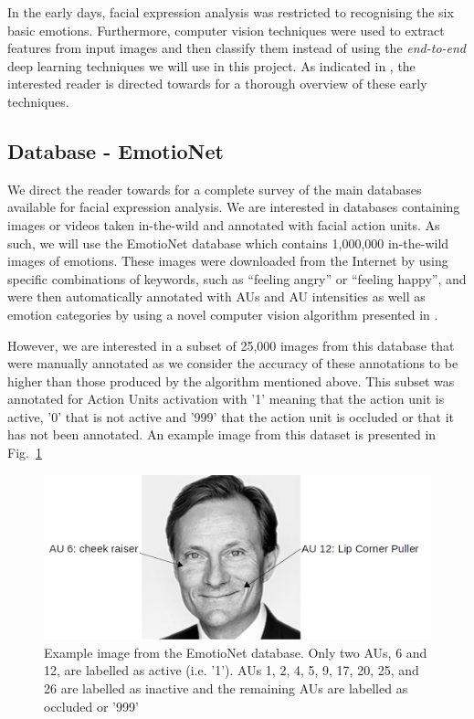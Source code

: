 \documentclass[12pt,twoside]{article}
\begin{document}
In the early days, facial expression analysis was restricted to recognising the six basic emotions. Furthermore, computer vision techniques were used to extract features from input images and then classify them instead of using the \textit{end-to-end} deep learning techniques we will use in this project. As indicated in \cite{RefWorks:2}, the interested reader is directed towards \cite{RefWorks:18,RefWorks:19} for a thorough overview of these early techniques.

\subsection{Database - EmotioNet}\label{sec:databases}

We direct the reader towards \cite{RefWorks:2} for a complete survey of the
main databases available for facial expression analysis. We are interested in
databases containing images or videos taken in-the-wild and annotated with
facial action units. As such, we will use the EmotioNet \cite{RefWorks:1}
database which contains 1,000,000 in-the-wild images of emotions. These images
were downloaded from the Internet by using specific combinations of keywords,
such as ``feeling angry'' or ``feeling happy'',
and were then automatically annotated with AUs and AU intensities as well as
emotion categories by using a novel computer vision algorithm presented in
\cite{RefWorks:1}.

However, we are interested in a subset of 25,000 images from this database that
were manually annotated as we consider the accuracy of these annotations to be
higher than those produced by the algorithm mentioned above. This subset was
annotated for Action Units activation with '1' meaning that the action unit is
active, '0' that is not active and '999' that the action unit is occluded or
that it has not been annotated. An example image from this dataset is
presented in Fig.~\ref{fig:emotionet_example}

\begin{figure}[ht]
  \centering
  \includegraphics[scale=0.7]{./figures/emotionet_example.png}
  \caption{Example image from the EmotioNet database. Only two AUs, 6 and 12,
  are labelled as active (i.e. '1'). AUs 1, 2, 4, 5, 9, 17, 20, 25, and 26
are labelled as inactive and the remaining AUs are labelled as occluded or '999'}
  \label{fig:emotionet_example}
\end{figure}
\end{document}
